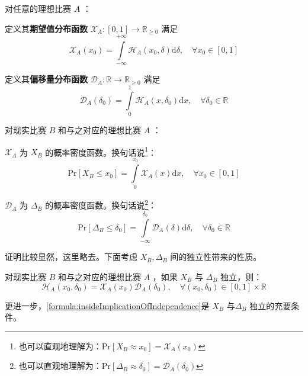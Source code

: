             \begin{definition}[期望值分布函数和偏移量分布函数]
                对任意的理想比赛 $A$ ：
                \begin{asparaitem}
                    \item 定义其\textbf{期望值分布函数} $\mathcal{X}_A:[0,1]\to\mathbb{R}_{\geq 0}$ 满足 $$\mathcal{X}_A(x_0)=\int\limits_{-\infty}^{+\infty}\mathcal{H}_A(x_0,\delta)\mathrm{d}\delta,\quad\forall x_0\in[0,1]$$
                    \item 定义其\textbf{偏移量分布函数} $\mathcal{D}_A:\mathbb{R}\to\mathbb{R}_{\geq 0}$ 满足 $$\mathcal{D}_A(\delta_0)=\int\limits_0^1\mathcal{H}_A(x,\delta_0)\mathrm{d}x,\quad\forall\delta_0\in\mathbb{R}$$
                \end{asparaitem}
                \label{def:marginalDistributions}
            \end{definition}

            \begin{proposition}[期望值分布函数和偏移量分布函数的实际含义]
                对现实比赛 $B$ 和与之对应的理想比赛 $A$ ：
                \begin{asparaitem}
                    \item $\mathcal{X}_A$ 为 $X_B$ 的概率密度函数。换句话说\footnote{也可以直观地理解为：$\mathrm{Pr}[X_B\approx x_0]=\mathcal{X}_A(x_0)$}：$$\mathrm{Pr}[X_B\leq x_0]=\int\limits_0^{x_0} \mathcal{X}_A(x)\mathrm{d}x,\quad\forall x_0\in[0,1]$$
                    \item $\mathcal{D}_A$ 为 $\Delta_B$ 的概率密度函数。换句话说\footnote{也可以直观地理解为：$\mathrm{Pr}[\Delta_B\approx \delta_0]=\mathcal{D}_A(\delta_0)$}：$$\mathrm{Pr}[\Delta_B\leq \delta_0]=\int\limits_{-\infty}^{\delta_0} \mathcal{D}_A(\delta)\mathrm{d}\delta,\quad\forall \delta_0\in\mathbb{R}$$
                \end{asparaitem}
                \label{prop:marginalDistributionsMeaning}
            \end{proposition}

            证明比较显然，这里略去。下面考虑 $X_B,\Delta_B$ 间的独立性带来的性质。

            \begin{proposition}
                对现实比赛 $B$ 和与之对应的理想比赛 $A$ ，如果 $X_B$ 与 $\Delta_B$ 独立，则：
                \begin{equation}
                    \mathcal{H}_A(x_0,\delta_0)=\mathcal{X}_A(x_0)\mathcal{D}_A(\delta_0),\quad\forall (x_0,\delta_0)\in[0,1]\times\mathbb{R}
                    \label{formula:insideImplicationOfIndependence}
                \end{equation}

                更进一步，\eqref{formula:insideImplicationOfIndependence}是 $X_B$ 与$\Delta_B$ 独立的充要条件。

                \label{prop:implicationOfIndependence}
            \end{proposition}

